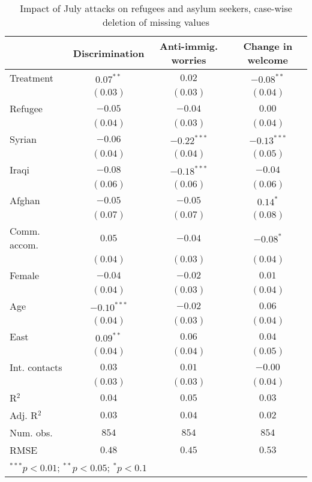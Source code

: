 
\begin{table}
\caption{Impact of July attacks on refugees and asylum seekers, case-wise deletion of missing values}
\begin{center}
\begin{tabular}{l c c c}
\toprule
 & Discrimination & Anti-immig. worries & Change in welcome \\
\midrule
Treatment     & $0.07^{**}$   & $0.02$        & $-0.08^{**}$  \\
              & $(0.03)$      & $(0.03)$      & $(0.04)$      \\
Refugee       & $-0.05$       & $-0.04$       & $0.00$        \\
              & $(0.04)$      & $(0.03)$      & $(0.04)$      \\
Syrian        & $-0.06$       & $-0.22^{***}$ & $-0.13^{***}$ \\
              & $(0.04)$      & $(0.04)$      & $(0.05)$      \\
Iraqi         & $-0.08$       & $-0.18^{***}$ & $-0.04$       \\
              & $(0.06)$      & $(0.06)$      & $(0.06)$      \\
Afghan        & $-0.05$       & $-0.05$       & $0.14^{*}$    \\
              & $(0.07)$      & $(0.07)$      & $(0.08)$      \\
Comm. accom.  & $0.05$        & $-0.04$       & $-0.08^{*}$   \\
              & $(0.04)$      & $(0.03)$      & $(0.04)$      \\
Female        & $-0.04$       & $-0.02$       & $0.01$        \\
              & $(0.04)$      & $(0.03)$      & $(0.04)$      \\
Age           & $-0.10^{***}$ & $-0.02$       & $0.06$        \\
              & $(0.04)$      & $(0.03)$      & $(0.04)$      \\
East          & $0.09^{**}$   & $0.06$        & $0.04$        \\
              & $(0.04)$      & $(0.04)$      & $(0.05)$      \\
Int. contacts & $0.03$        & $0.01$        & $-0.00$       \\
              & $(0.03)$      & $(0.03)$      & $(0.04)$      \\
\midrule
R$^2$         & $0.04$        & $0.05$        & $0.03$        \\
Adj. R$^2$    & $0.03$        & $0.04$        & $0.02$        \\
Num. obs.     & $854$         & $854$         & $854$         \\
RMSE          & $0.48$        & $0.45$        & $0.53$        \\
\bottomrule
\multicolumn{4}{l}{\scriptsize{$^{***}p<0.01$; $^{**}p<0.05$; $^{*}p<0.1$}}
\end{tabular}
\label{tab_host_na}
\end{center}
\end{table}
